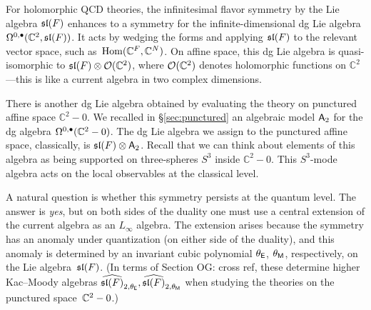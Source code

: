 \documentclass[11pt]{amsart}
\def\SU{{\rm SU}}
\def\C{{\mathbb{C}}}
\def\lie#1{\ensuremath{\mathfrak{#1}}}
\def\owen#1{{\textcolor{violet!65!black}{OG: {#1}}}}
\begin{document}
%
%
%

For holomorphic QCD theories, the infinitesimal flavor symmetry by the Lie algebra $\sl(F)$ enhances to a symmetry for the infinite-dimensional dg Lie algebra $\Omega^{0,\bu}(\CC^2, \sl(F))$.
It acts by wedging the forms and applying $\sl(F)$ to the relevant vector space, such as~$\Hom(\CC^F,\CC^N)$.
On affine space, this dg Lie algebra is quasi-isomorphic to $\lie{sl}(F) \otimes \cO(\C^2)$, where $\cO(\C^2)$ denotes holomorphic functions on $\C^2$---this is like a current algebra in two complex dimensions.

There is another dg Lie algebra obtained by evaluating the theory on punctured affine space $\C^2 - 0$.
We recalled in \S \ref{sec:punctured} an algebraic model $\sfA_2$ for the dg algebra $\Omega^{0,\bu}(\C^2 - 0)$.
The dg Lie algebra we assign to the punctured affine space, classically, is $\lie{sl}(F) \otimes \sfA_2$.
Recall that we can think about elements of this algebra as being supported on three-spheres $S^3$ inside $\C^2 - 0$.
This $S^3$-mode algebra acts on the local observables at the classical level.

A natural question is whether this symmetry persists at the quantum level. 
The answer is {\em yes}, but on both sides of the duality one must use a central extension of the current algebra as an $L_\infty$ algebra.
The extension arises because the symmetry has an anomaly under quantization (on either side of the duality),
and this anomaly is determined by an  invariant cubic polynomial $\theta_\sfE$, $\theta_\sfM$, respectively, on the Lie algebra~$\sl(F)$. 
(In terms of Section \owen{cross ref}, these determine higher Kac--Moody algebras $\Hat{\sl(F)}_{2,\theta_{\sfE}}, \Hat{\sl(F)}_{2,\theta_{\sfM}}$ when studying the theories on the punctured space~$\CC^2 - 0$.)
\end{document}
